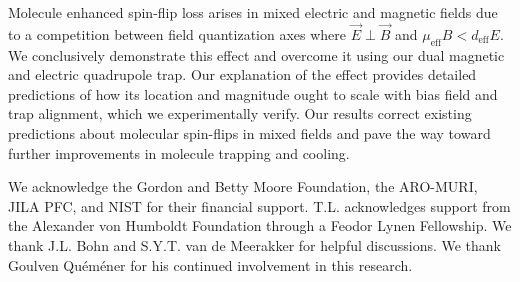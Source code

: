 \documentclass[%
 reprint,
 amsmath,amssymb,
 aps,
prl,
]{revtex4-1}
\newcommand{\epb}{{$\vec{E}\!\perp\!\vec{B}$}}
\begin{document}
Molecule enhanced spin-flip loss arises in mixed electric and magnetic fields due to a competition between field quantization axes where \epb{} and $\mu_\text{eff}B<d_\text{eff}E$. We conclusively demonstrate this effect and overcome it using our dual magnetic and electric quadrupole trap. Our explanation of the effect provides detailed predictions of how its location and magnitude ought to scale with bias field and trap alignment, which we experimentally verify. Our results correct existing predictions about molecular spin-flips in mixed fields and pave the way toward further improvements in molecule trapping and cooling.

We acknowledge the Gordon and Betty Moore Foundation, the ARO-MURI, JILA PFC, and NIST for their financial support. T.L. acknowledges support from the Alexander von Humboldt Foundation through a Feodor Lynen Fellowship. We thank J.L. Bohn and S.Y.T. van de Meerakker for helpful discussions. We thank Goulven Qu\'em\'ener for his continued involvement in this research.


%
\end{document}
